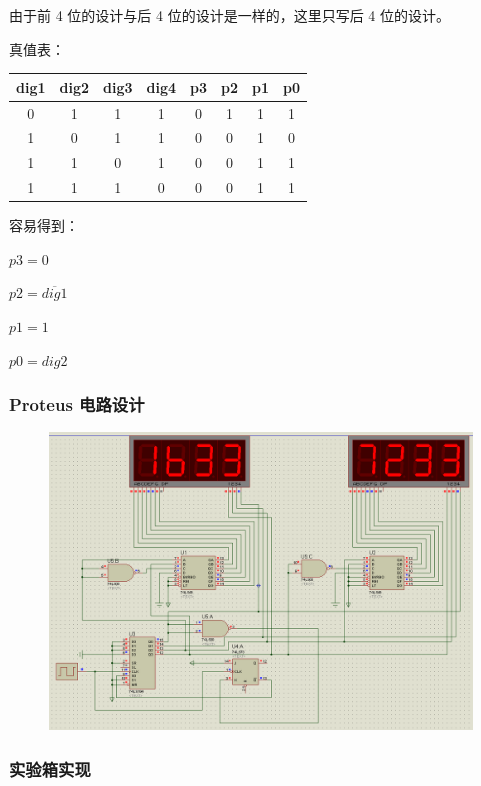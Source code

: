 \documentclass{article}
\begin{document}
由于前 4 位的设计与后 4 位的设计是一样的，这里只写后 4 位的设计。

真值表：

\begin{table}[!hbp]
\centering
\begin{tabular}{|c|c|c|c||c|c|c|c|}
\hline
dig1 & dig2 & dig3 & dig4 & p3 & p2 & p1 & p0 \\
\hline
0 & 1 & 1 & 1 & 0 & 1 & 1 & 1 \\
\hline
1 & 0 & 1 & 1 & 0 & 0 & 1 & 0 \\
\hline
1 & 1 & 0 & 1 & 0 & 0 & 1 & 1 \\
\hline
1 & 1 & 1 & 0 & 0 & 0 & 1 & 1 \\
\hline

\end{tabular}

\end{table}

容易得到：

$p3 = 0$

$p2 = \overline{dig1}$

$p1 = 1$

$p0 = dig2$


\subsubsection*{Proteus 电路设计}

\begin{figure}[!hbp]
  \centering
  \includegraphics[scale=0.3]{lab7-2.png}
\end{figure}

\newpage

\subsubsection*{实验箱实现}
\end{document}
